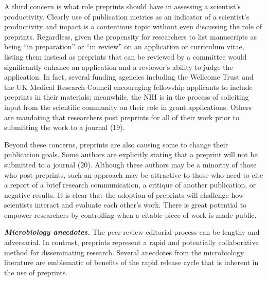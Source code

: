 \documentclass[11pt,]{article}
\begin{document}
A third concern is what role preprints should have in assessing a
scientist's productivity. Clearly use of publication metrics as an
indicator of a scientist's productivity and impact is a contentious
topic without even discussing the role of preprints. Regardless, given
the propensity for researchers to list manuscripts as being ``in
preparation'' or ``in review'' on an application or curriculum vitae,
listing them instead as preprints that can be reviewed by a committee
would significantly enhance an application and a reviewer's ability to
judge the application. In fact, several funding agencies including the
Wellcome Trust and the UK Medical Research Council encouraging
fellowship applicants to include preprints in their materials;
meanwhile, the NIH is in the process of soliciting input from the
scientific community on their role in grant applications. Others are
mandating that researchers post preprints for all of their work prior to
submitting the work to a journal (19).

Beyond these concerns, preprints are also causing some to change their
publication goals. Some authors are explicitly stating that a preprint
will not be submitted to a journal (20). Although these authors may be a
minority of those who post preprints, such an approach may be attractive
to those who need to cite a report of a brief research communication, a
critique of another publication, or negative results. It is clear that
the adoption of preprints will challenge how scientists interact and
evaluate each other's work. There is great potential to empower
researchers by controlling when a citable piece of work is made public.

\textbf{\emph{Microbiology anecdotes.}} The peer-review editorial
process can be lengthy and adversarial. In contrast, preprints represent
a rapid and potentially collaborative method for disseminating research.
Several anecdotes from the microbiology literature are emblematic of
benefits of the rapid release cycle that is inherent in the use of
preprints.
\end{document}
